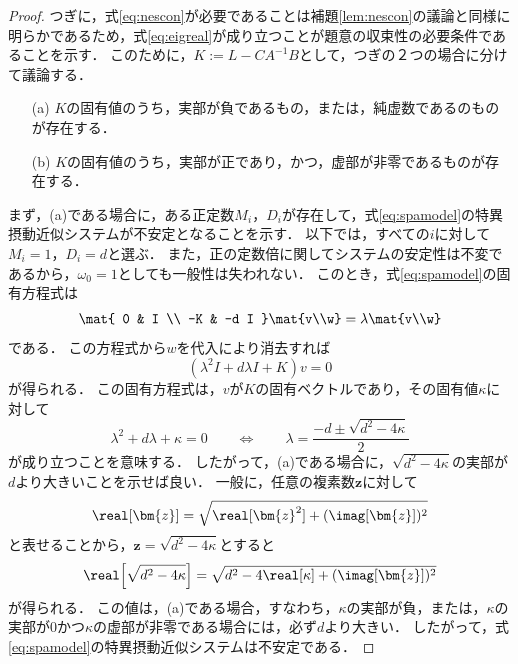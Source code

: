 \documentclass[a4j,10pt,oneside,openany,dvipdfmx]{jsbook}
\begin{document}
\begin{proof}
つぎに，式\eqref{eq:nescon}が必要であることは補題\ref{lem:nescon}の議論と同様に明らかであるため，式\eqref{eq:eigreal}が成り立つことが題意の収束性の必要条件であることを示す．
このために，$K:=L-CA^{-1}B$として，つぎの２つの場合に分けて議論する．
\begin{itemize}
\item[(a)] $K$の固有値のうち，実部が負であるもの，または，純虚数であるのものが存在する．
\item[(b)] $K$の固有値のうち，実部が正であり，かつ，虚部が非零であるものが存在する．
\end{itemize}
まず，(a)である場合に，ある正定数$M_i$，$D_i$が存在して，式\eqref{eq:spamodel}の特異摂動近似システムが不安定となることを示す．
以下では，すべての$i$に対して$M_i=1$，$D_i=d$と選ぶ．
また，正の定数倍に関してシステムの安定性は不変であるから，$\omega_0 =1$としても一般性は失われない．
このとき，式\eqref{eq:spamodel}の固有方程式は
\[
\mat{
0 & I \\
-K & -d I
}
\mat{v\\w}
=
\lambda \mat{v\\w}
\]
である．
この方程式から$w$を代入により消去すれば
\[
\left(\lambda^2 I +d \lambda I + K
\right) v =0
\]
が得られる．
この固有方程式は，$v$が$K$の固有ベクトルであり，その固有値$\kappa$に対して
\[
\lambda^2 + d\lambda +\kappa =0
\qquad
\Longleftrightarrow
\qquad
\lambda = \frac{-d \pm \sqrt{d^2-4\kappa} }{2}
\]
が成り立つことを意味する．
したがって，(a)である場合に，$\sqrt{d^2 - 4\kappa }$の実部が$d$より大きいことを示せば良い．
一般に，任意の複素数$\bm{z}$に対して
\[
\real[\bm{z}] = \sqrt{ \real[\bm{z}^2 ] + (\imag[\bm{z}])^2 }
\]
と表せることから，$\bm{z} = \sqrt{d^2 - 4\kappa }$とすると
\[
\real \Bigl[
\sqrt{d^2 - 4\kappa }
\Bigr]
=\sqrt{
d^2 - 4 \real[\kappa]
+
(\imag[ \bm{z} ])^2
}
\]
が得られる．
この値は，(a)である場合，すなわち，$\kappa$の実部が負，または，$\kappa$の実部が0かつ$\kappa$の虚部が非零である場合には，必ず$d$より大きい．
したがって，式\eqref{eq:spamodel}の特異摂動近似システムは不安定である．


\end{proof}
\end{document}
